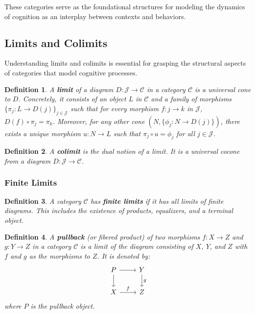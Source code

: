 \documentclass{article}
\newtheorem{definition}{Definition}[section]
\begin{document}
These categories serve as the foundational structures for modeling the dynamics of cognition as an interplay between contexts and behaviors.

\subsection{Limits and Colimits}

Understanding limits and colimits is essential for grasping the structural aspects of categories that model cognitive processes.

\begin{definition}
A \textbf{limit} of a diagram $D \colon \mathcal{J} \to \mathcal{C}$ in a category $\mathcal{C}$ is a universal cone to $D$. Concretely, it consists of an object $L$ in $\mathcal{C}$ and a family of morphisms $\{\pi_j \colon L \to D(j)\}_{j \in \mathcal{J}}$ such that for every morphism $f \colon j \to k$ in $\mathcal{J}$, $D(f) \circ \pi_j = \pi_k$. Moreover, for any other cone $(N, \{\phi_j \colon N \to D(j)\})$, there exists a unique morphism $u \colon N \to L$ such that $\pi_j \circ u = \phi_j$ for all $j \in \mathcal{J}$.
\end{definition}

\begin{definition}
A \textbf{colimit} is the dual notion of a limit. It is a universal cocone from a diagram $D \colon \mathcal{J} \to \mathcal{C}$.
\end{definition}

\subsubsection{Finite Limits}

\begin{definition}
A category $\mathcal{C}$ has \textbf{finite limits} if it has all limits of finite diagrams. This includes the existence of products, equalizers, and a terminal object.
\end{definition}

\begin{definition}
A \textbf{pullback} (or fibered product) of two morphisms $f \colon X \to Z$ and $g \colon Y \to Z$ in a category $\mathcal{C}$ is a limit of the diagram consisting of $X$, $Y$, and $Z$ with $f$ and $g$ as the morphisms to $Z$. It is denoted by:
\[
\begin{tikzcd}
P \arrow[r] \arrow[d] & Y \arrow[d, "g"] \\
X \arrow[r, "f"] & Z
\end{tikzcd}
\]
where $P$ is the pullback object.
\end{definition}
\end{document}
